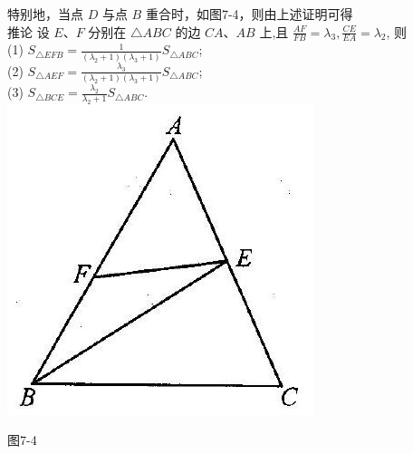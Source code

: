 \documentclass[10pt]{article}
\begin{document}
特别地，当点 $D$ 与点 $B$ 重合时，如图7-4，则由上述证明可得\\
推论 设 $E 、 F$ 分别在 $\triangle A B C$ 的边 $C A 、 A B$ 上,且 $\frac{A F}{F B}=\lambda_{3}, \frac{C E}{E A}=\lambda_{2}$, 则\\
(1) $S_{\triangle E F B}=\frac{1}{\left(\lambda_{2}+1\right)\left(\lambda_{3}+1\right)} S_{\triangle A B C}$;\\
(2) $S_{\triangle A E F}=\frac{\lambda_{3}}{\left(\lambda_{2}+1\right)\left(\lambda_{3}+1\right)} S_{\triangle A B C}$;\\
(3) $S_{\triangle B C E}=\frac{\lambda_{2}}{\lambda_{2}+1} S_{\triangle A B C}$.\\
\includegraphics[max width=\textwidth, center]{2024_10_30_2c8f45efd4a519b08e1ag-077(1)}

图7-4
\end{document}
